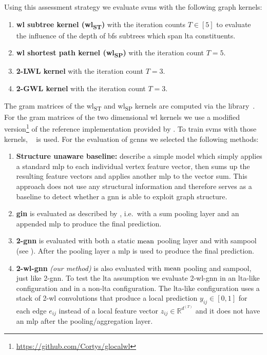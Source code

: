 Using this assessment strategy we evaluate \acp{svm} with the following graph kernels:
\begin{enumerate}[label={\textbf{\arabic*.}},itemsep=2pt,parsep=2pt]
	\item \textbf{\ac{wl} subtree kernel (\acs{wl}\textsubscript{ST})} with the iteration counts $T \in [5]$ to evaluate the influence of the depth of \ac{bfs} subtrees which span \ac{lta} constituents.
	\item \textbf{\ac{wl} shortest path kernel (\acs{wl}\textsubscript{SP})} with the iteration count $T = 5$.
	\item \textbf{2-LWL kernel} with the iteration count $T = 3$.
	\item \textbf{2-GWL kernel} with the iteration count $T = 3$.
\end{enumerate}
The gram matrices of the \acs{wl}\textsubscript{ST} and \acs{wl}\textsubscript{SP} kernels are computed via the  library~\cite{Siglidis2018}\cite{GK}.
For the gram matrices of the two dimensional \ac{wl} kernels we use a modified version\footnote{\url{https://github.com/Cortys/glocalwl}} of the reference implementation provided by \citet{Morris2017}.
To train \acp{svm} with those kernels, ~\cite{Pedregosa2011}\cite{SKL} is used.
For the evaluation of \acp{gcnn} we selected the following methods:
\begin{enumerate}[label={\textbf{\arabic*.}},itemsep=2pt,parsep=2pt]
	\item \textbf{Structure unaware baseline:}
		\citet{Errica2020} describe a simple model which simply applies a standard \ac{mlp} to each individual vertex feature vector, then sums up the resulting feature vectors and applies another \ac{mlp} to the vector sum.
		This approach does not use any structural information and therefore serves as a baseline to detect whether a \ac{gnn} is able to exploit graph structure.
	\item \textbf{\ac{gin}} is evaluated as described by \citet{Xu2018}, i.e.\ with a sum pooling layer and an appended \ac{mlp} to produce the final prediction.
	\item \textbf{2-\acs{gnn}} is evaluated with both a static $\operatorname{mean}$ pooling layer and with \ac{sampool} (see ).
		After the pooling layer a \ac{mlp} is used to produce the final prediction.
	\item \textbf{2-\acs{wl}-\ac{gnn}} \textit{(our method)} is also evaluated with $\operatorname{mean}$ pooling and \ac{sampool}, just like 2-\ac{gnn}.
		To test the \ac{lta} assumption we evaluate 2-\acs{wl}-\acs{gnn} in an \acs{lta}-like configuration and in a non-\acs{lta} configuration.
		The \acs{lta}-like configuration uses a stack of 2-\acs{wl} convolutions that produce a local prediction $y_{ij} \in [0, 1]$ for each edge $e_{ij}$ instead of a local feature vector $z_{ij} \in \mathbb{R}^{d^{(T)}}$ and it does not have an \ac{mlp} after the pooling/aggregation layer.
\end{enumerate}
